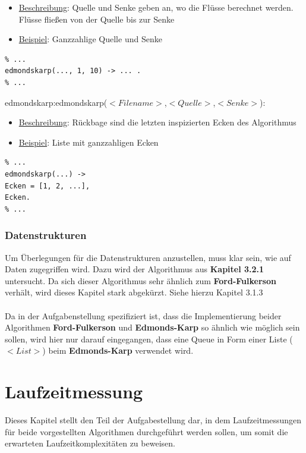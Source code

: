 \documentclass[11pt]{article}
\begin{document}
    \begin{itemize}
        \item \underline{Beschreibung}: Quelle und Senke geben an, wo die Fl\"usse berechnet werden. Fl\"usse flie\ss{}en von der Quelle bis zur Senke
        \item \underline{Beispiel}: Ganzzahlige Quelle und Senke
    \end{itemize}
\begin{lstlisting}
% ...
edmondskarp(..., 1, 10) -> ... .
% ...
\end{lstlisting}
    edmondskarp:edmondskarp($<Filename>$,$<Quelle>$,$<Senke>$):\\ 
    \begin{itemize}
        \item \underline{Beschreibung}: R\"uckbage sind die letzten inspizierten Ecken des Algorithmus
        \item \underline{Beispiel}: Liste mit ganzzahligen Ecken
    \end{itemize}
\begin{lstlisting}
% ...
edmondskarp(...) ->
Ecken = [1, 2, ...],
Ecken.
% ...
\end{lstlisting}

    \subsubsection{Datenstrukturen}
    Um \"Uberlegungen f\"ur die Datenstrukturen anzustellen, muss klar sein, wie auf Daten zugegriffen wird. Dazu wird der Algorithmus aus \textbf{Kapitel 3.2.1} untersucht. Da sich dieser Algorithmus sehr \"ahnlich zum \textbf{Ford-Fulkerson} verh\"alt, wird dieses Kapitel stark abgek\"urzt. Siehe hierzu Kapitel 3.1.3\\~\\
    Da in der Aufgabenstellung spezifiziert ist, dass die Implementierung beider Algorithmen \textbf{Ford-Fulkerson} und \textbf{Edmonds-Karp} so \"ahnlich wie m\"oglich sein sollen, wird hier nur darauf eingegangen, dass eine Queue in Form einer Liste ($<List>$) beim \textbf{Edmonds-Karp} verwendet wird.

    \section{Laufzeitmessung}
    Dieses Kapitel stellt den Teil der Aufgabestellung dar, in dem Laufzeitmessungen f\"ur beide vorgestellten Algorithmen durchgef\"uhrt werden sollen, um somit die erwarteten Laufzeitkomplexit\"aten zu beweisen.
\end{document}
